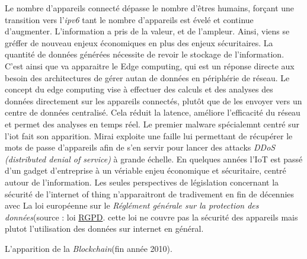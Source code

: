 Le nombre d'appareils connecté  dépasse le nombre d'êtres humains, forçant une transition vers l'\textit{ipv6} tant le nombre d'appareils est évelé et continue d'augmenter. L'information a pris de la valeur, et de l'ampleur. Ainsi, viens se gréffer de nouveau enjeux économiques en plus des enjeux sécuritaires. La quantité de données générées nécessite de revoir le stockage de l'information. C'est ainsi que va apparaitre le Edge computing\cite{edge}, qui est un réponse directe aux besoin des architectures de gérer autan de données en périphérie de réseau. Le concept du edge computing vise à effectuer des calculs et des analyses des données directement sur les appareils connectés, plutôt que de les envoyer vers un centre de données centralisé. Cela réduit la latence, améliore l'efficacité du réseau et permet des analyses en temps réel. Le premier malware spécialemnt centré sur l'iot fait son apparition. Mirai\cite{Mirai} exploite une faille lui permettant de récupérer le mots de passe d'appareils afin de s'en servir pour lancer des attacks \textit{DDoS (distributed denial of service)} à grande échelle. En quelques années l'IoT est passé d'un gadget d'entreprise à un vériable enjeu économique et sécuritaire, centré autour de l'information. Les seules perspectives de législation concernant la sécurité de l'internet of thing n'apparaitront de tradivement en fin de décennies avec La loi européenne sur le \textit{Réglément générale sur la protection des données}(source : loi \href{https://commission.europa.eu/law/law-topic/data-protection/data-protection-eu_en}{RGPD}. cette loi ne couvre pas la sécurité des appareils mais plutot l'utilisation des données sur internet en général.

\vspace{0.1cm}

L'apparition de la \textit{Blockchain}(fin année 2010).

